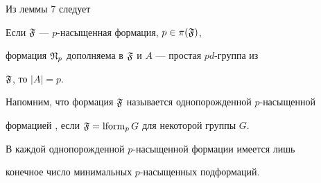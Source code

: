 Из леммы 7 следует 


 


\begin{lem} Если $\frak F$ --- $p$-насыщенная формация, $p\in\pi(\frak F)$, 


формация $\frak N_p$ дополняема в $\frak F$ и $A$ --- простая $pd$-группа из 


$\frak F$, то $|A|=p$. 


\end{lem} 


 


Напомним, что формация $\frak F$ называется однопорожденной $p$-насыщенной 


формацией \cite{Ski1}, если $\frak F=\operatorname{lform}_pG$ для некоторой группы $G$. 


 


\begin{lem} В каждой однопорожденной $p$-насыщенной формации имеется лишь 


конечное число минимальных $p$-насыщенных подформаций. 


\end{lem} 


 


